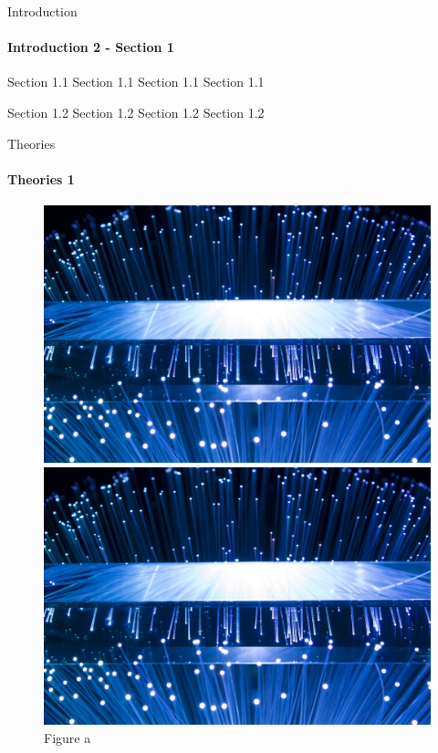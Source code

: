 \documentclass[t]{beamer}
\begin{document}
\begin{frame}{Introduction}
\framesubtitle{Introduction 2 - Section 1}
\label{P4 Introduction}

\begin{block}{Section 1.1}
    Section 1.1 Section 1.1 Section 1.1\cite{einstein}
\end{block}
\begin{block}{Section 1.2}
    Section 1.2 Section 1.2 Section 1.2
\end{block}

\end{frame}


\begin{frame}{Theories}
\framesubtitle{Theories 1}
\label{P5 Theories}

\begin{center}
    \begin{figure}[htbp]
        \centering
        \begin{minipage}[t]{0.3\textwidth}
            \centering
            \includegraphics[width=\textwidth]{image/a}
                    \caption*{Figure a}
        \end{minipage}
    \hfill
        \begin{minipage}[t]{0.3\textwidth}
            \centering
            \includegraphics[width=\textwidth]{image/a}

\end{minipage}
\end{figure}
\end{center}
\end{frame}
\end{document}
